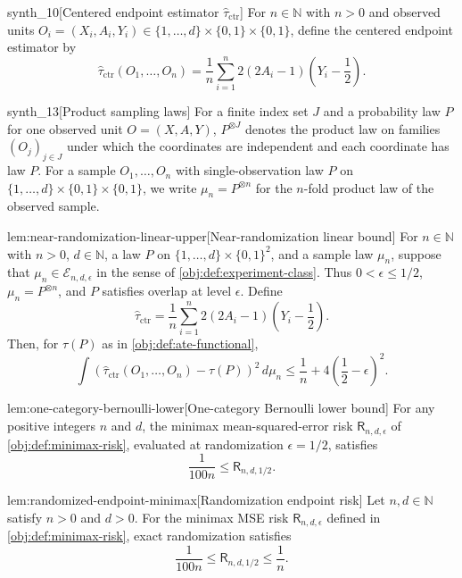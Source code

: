 \begin{definitionv}{synth_10}[Centered endpoint estimator $\widehat\tau_{\mathrm{ctr}}$]
For \(n\in\mathbb N\) with \(n>0\) and observed units \(O_i=(X_i,A_i,Y_i)\in\{1,\ldots,d\}\times\{0,1\}\times\{0,1\}\), define the centered endpoint estimator by \[ \widehat\tau_{\mathrm{ctr}}(O_1,\ldots,O_n)=\frac1n\sum_{i=1}^n 2(2A_i-1)\left(Y_i-\frac12\right). \]
\end{definitionv}

\begin{definitionv}{synth_13}[Product sampling laws]
For a finite index set \(J\) and a probability law \(P\) for one observed unit \(O=(X,A,Y)\), \(P^{\otimes J}\) denotes the product law on families \((O_j)_{j\in J}\) under which the coordinates are independent and each coordinate has law \(P\). For a sample \(O_1,\ldots,O_n\) with single-observation law \(P\) on \(\{1,\ldots,d\}\times\{0,1\}\times\{0,1\}\), we write \(\mu_n=P^{\otimes n}\) for the \(n\)-fold product law of the observed sample.
\end{definitionv}

\begin{lemmav}{lem:near-randomization-linear-upper}[Near-randomization linear bound]
For \(n\in\mathbb N\) with \(n>0\), \(d\in\mathbb N\), a law \(P\) on \(\{1,\ldots,d\}\times\{0,1\}^2\), and a sample law \(\mu_n\), suppose that \(\mu_n\in\mathcal E_{n,d,\epsilon}\) in the sense of \cref{obj:def:experiment-class}. Thus \(0<\epsilon\le 1/2\), \(\mu_n=P^{\otimes n}\), and \(P\) satisfies overlap at level \(\epsilon\). Define
\[
\widehat\tau_{\mathrm{ctr}}
=
\frac1n\sum_{i=1}^n
2(2A_i-1)\left(Y_i-\frac12\right).
\]
Then, for \(\tau(P)\) as in \cref{obj:def:ate-functional},
\[
\int
\left(\widehat\tau_{\mathrm{ctr}}(O_1,\ldots,O_n)-\tau(P)\right)^2
\,d\mu_n
\le
\frac1n+4\left(\frac12-\epsilon\right)^2 .
\]
\end{lemmav}

\begin{lemmav}{lem:one-category-bernoulli-lower}[One-category Bernoulli lower bound]
For any positive integers \(n\) and \(d\), the minimax mean-squared-error risk \(\mathsf R_{n,d,\epsilon}\) of \cref{obj:def:minimax-risk}, evaluated at randomization \(\epsilon=1/2\), satisfies
\[
\frac{1}{100n}\le \mathsf R_{n,d,1/2}.
\]
\end{lemmav}

\begin{lemmav}{lem:randomized-endpoint-minimax}[Randomization endpoint risk]
Let \(n,d\in\mathbb N\) satisfy \(n>0\) and \(d>0\). For the minimax MSE risk \(\mathsf R_{n,d,\epsilon}\) defined in \cref{obj:def:minimax-risk}, exact randomization satisfies
\[
\frac{1}{100n}\le \mathsf R_{n,d,1/2}\le \frac{1}{n}.
\]
\end{lemmav}

